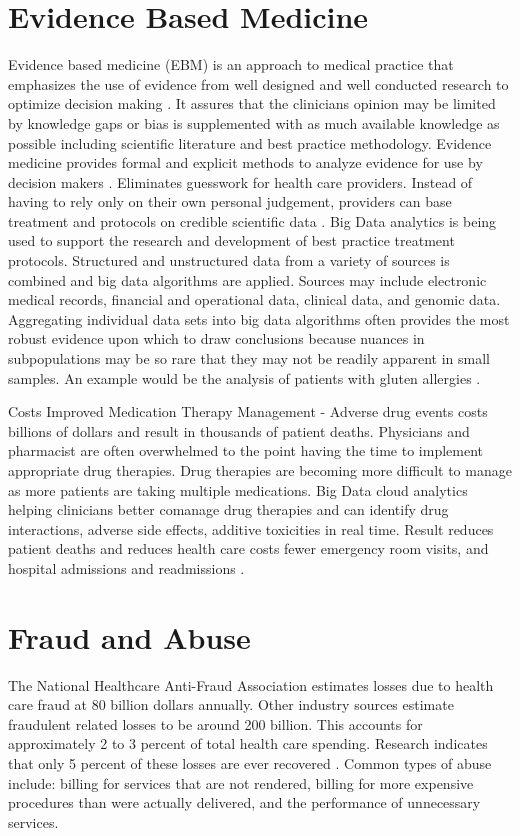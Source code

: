 \documentclass[sigconf]{acmart}
\begin{document}
\section{Evidence Based Medicine}
Evidence based medicine (EBM) is an approach to medical practice that emphasizes the use of evidence from well designed and well conducted research to optimize decision making \cite{www-google-wikievi}.  It assures that the clinicians opinion may be limited by knowledge gaps or bias is supplemented with as much available knowledge as possible including scientific literature and best practice methodology. Evidence medicine provides formal and explicit methods to analyze evidence for use by decision makers \cite{www-google-wikievi}.  Eliminates guesswork for health care providers. Instead of having to rely only on their own personal judgement, providers can base treatment and protocols on credible scientific data \cite{www-google-christian}.
Big Data analytics is being used to support the research and development of best practice treatment protocols.  Structured and unstructured data from a variety of sources is combined and big data algorithms are applied. Sources may include electronic medical records, financial and operational data, clinical data, and genomic data. Aggregating individual data sets into big data algorithms often provides the most robust evidence upon which to draw conclusions because nuances in subpopulations may be so rare that they may not be readily apparent in small samples. An example would be the analysis of patients with gluten allergies \cite{www-google-McKinsey}.
 
\Drug Costs
Improved Medication Therapy Management - Adverse drug events costs billions of dollars and result in thousands of patient deaths.  Physicians and pharmacist are often overwhelmed to the point having the time to implement appropriate drug therapies. Drug therapies are becoming more difficult to manage as more patients are taking multiple medications.  Big Data cloud analytics helping clinicians better comanage drug therapies and can identify drug interactions, adverse side effects, additive toxicities in real time. Result reduces patient deaths and reduces health care costs fewer emergency room visits, and hospital admissions and readmissions \cite{datafloq}.
\section{Fraud and Abuse}
The National Healthcare Anti-Fraud Association estimates losses due to health care fraud at 80 billion dollars annually. Other industry sources estimate fraudulent related losses to be around 200 billion. This accounts for approximately 2 to 3 percent of total health care spending. Research indicates that only 5 percent of these losses are ever recovered \cite{www-google-datameer}.
Common types of abuse include: billing for services that are not rendered, billing for more expensive procedures than were actually delivered, and the performance of unnecessary services. 
\end{document}
